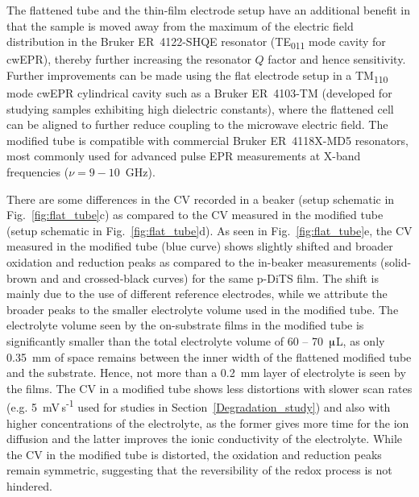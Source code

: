\par
The flattened tube and the thin-film electrode setup have an additional benefit in that the sample is moved away from the maximum of the electric field distribution in the Bruker ER~4122-SHQE resonator (TE\textsubscript{011} mode cavity for cwEPR), thereby further increasing the resonator $Q$ factor and hence sensitivity. Further improvements can be made using the flat electrode setup in a TM\textsubscript{110} mode cwEPR cylindrical cavity such as a Bruker ER~4103-TM (developed for studying samples exhibiting high dielectric constants), where the flattened cell can be aligned to further reduce coupling to the microwave electric field. The modified tube is compatible with commercial Bruker ER~4118X-MD5 resonators, most commonly used for advanced pulse EPR measurements at X-band frequencies ($\nu = 9-10$~GHz).\\

\par
There are some differences in the CV recorded in a beaker (setup schematic in Fig.~\ref{fig:flat_tube}c) as compared to the CV measured in the modified tube (setup schematic in Fig.~\ref{fig:flat_tube}d). As seen in Fig.~\ref{fig:flat_tube}e, the CV measured in the modified tube (blue curve) shows slightly shifted and broader oxidation and reduction peaks as compared to the in-beaker measurements (solid-brown and and crossed-black curves) for the same p-DiTS film. The shift is mainly due to the use of different reference electrodes, while we attribute the broader peaks to the smaller electrolyte volume used in the modified tube. The electrolyte volume seen by the on-substrate films in the modified tube is significantly smaller than the total electrolyte volume of 60 -- 70~$\muup$L, as only 0.35~mm of space remains between the inner width of the flattened modified tube and the substrate. Hence, not more than a 0.2~mm layer of electrolyte is seen by the films. The CV in a modified tube shows less distortions with slower scan rates (e.g. 5~mV\,s\textsuperscript{-1} used for studies in Section~\ref{Degradation_study}) and also with higher concentrations of the electrolyte, as the former gives more time for the ion diffusion and the latter improves the ionic conductivity of the electrolyte. While the CV in the modified tube is distorted, the oxidation and reduction peaks remain symmetric, suggesting that the reversibility of the redox process is not hindered.



